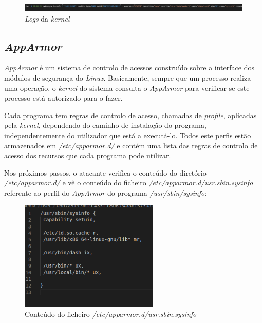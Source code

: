 \documentclass[10pt,english]{article}
\begin{document}
\begin{figure}[h]
    \centering
    \includegraphics[width=\textwidth]{images/kernellog.png}
    \caption{\textit{Logs} da \textit{kernel}}
\end{figure}

\clearpage

\subsection{\textit{AppArmor}}

\par \textit{AppArmor} é um sistema de controlo de acessos construído sobre a interface dos módulos de segurança do \textit{Linux}. Basicamente, sempre que um processo realiza uma operação, o \textit{kernel} do sistema consulta o \textit{AppArmor} para verificar se este processo está autorizado para o fazer. 

\par Cada programa tem regras de controlo de acesso, chamadas de \textit{profile}, aplicadas pela \textit{kernel}, dependendo do caminho de instalação do programa, independentemente do utilizador que está a executá-lo. Todos este perfis estão armazenados em \textit{/etc/apparmor.d/} e contém uma lista das regras de controlo de acesso dos recursos que cada programa pode utilizar.

\par Nos próximos passos, o atacante verifica o conteúdo do diretório \textit{/etc/apparmor.d/} e vê o conteúdo do ficheiro \textit{/etc/apparmor.d/usr.sbin.sysinfo} referente ao perfil do \textit{AppArmor} do programa \textit{/usr/sbin/sysinfo}:


\begin{figure}[h]
    \centering
    \includegraphics[width=250]{images/apparmor.png}
    \caption{Conteúdo do ficheiro \textit{/etc/apparmor.d/usr.sbin.sysinfo}}
\end{figure}
\end{document}
